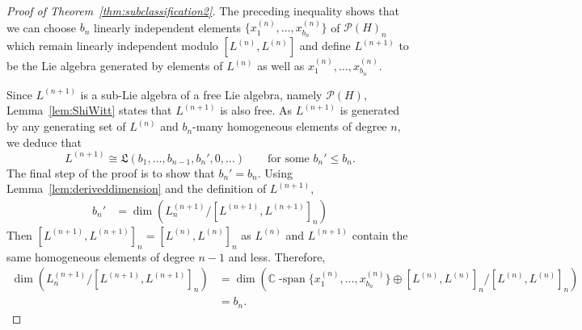 \documentclass[11pt]{amsart}
\theoremstyle{definition}
\numberwithin{equation}{section}
\def\CC{{\mathbb C}}
\begin{document}
\begin{proof}[Proof of Theorem~\ref{thm:subclassification2}]
The preceding inequality shows that we can choose $b_{n}$ linearly independent elements $\{x^{(n)}_{1}, \ldots, x^{(n)}_{b_{n}}\}$ of $\mathcal{P}(H)_{n}$ which remain linearly independent modulo $[L^{(n)}, L^{(n)}]$ and define $L^{(n+1)}$ to be the Lie algebra generated by  elements of $L^{(n)}$ as well as $x^{(n)}_{1}, \ldots, x^{(n)}_{b_{n}}$.

Since $L^{(n+1)}$ is a sub-Lie algebra of a free Lie algebra, namely $\mathcal{P}(H)$, Lemma~\ref{lem:ShiWitt} states that $L^{(n+1)}$ is also free.  
As $L^{(n+1)}$ is generated by any generating set of $L^{(n)}$ and $b_{n}$-many homogeneous elements of degree $n$, we deduce that
\[
L^{(n+1)} \cong \mathfrak{L}(b_{1}, \ldots, b_{n-1}, b_{n}', 0, \ldots )
\qquad\text{for some $b_{n}' \le b_{n}$}.
\]
The final step of the proof is to show that $b_{n}' = b_{n}$.  Using Lemma~\ref{lem:deriveddimension} and the definition of $L^{(n+1)}$,
\begin{align*}
b_{n}' &= \dim\left( L^{(n+1)}_{n} \big/ [L^{(n+1)}, L^{(n+1)}]_{n}\right)%
\end{align*}
Then $[L^{(n+1)}, L^{(n+1)}]_{n} = [L^{(n)}, L^{(n)}]_{n}$ as $L^{(n)}$ and $L^{(n+1)}$ contain the same homogeneous elements of degree $n - 1$ and less.  Therefore,
\begin{align*}
 \dim\!\left( L^{(n+1)}_{n} \big/ [L^{(n+1)}, L^{(n+1)}]_{n}\right) 
&= \dim\!\left(  \CC\operatorname{-span}\{x^{(n)}_{1}, \ldots, x^{(n)}_{b_{n}}\} \oplus [L^{(n)}, L^{(n)}]_{n} \big/ [L^{(n)}, L^{(n)}]_{n} \right) \\
&= b_{n}.
\end{align*}
\end{proof}
\end{document}
